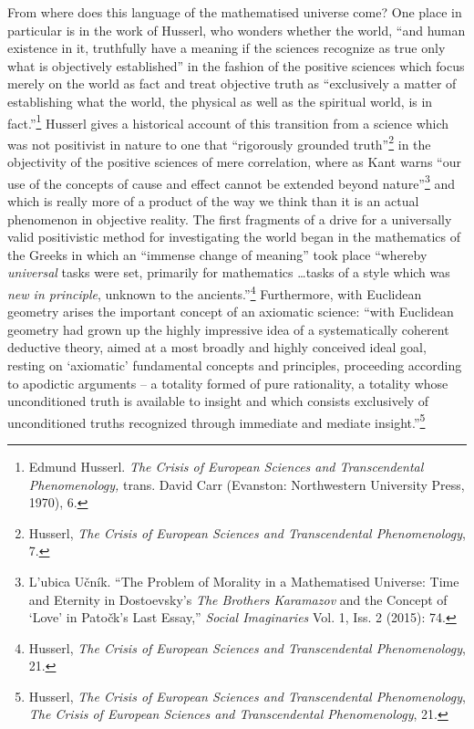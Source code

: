 \documentclass[12pt]{article}
\begin{document}
	From where does this language of the mathematised universe come? One place in particular is in the work of Husserl, who wonders whether the world, ``and human existence in it, truthfully have a meaning if the sciences recognize as true only what is objectively established'' in the fashion of the positive sciences which focus merely on the world as fact and treat objective truth as ``exclusively a matter of establishing what the world, the physical as well as the spiritual world, is in fact.''\footnote{Edmund Husserl. \emph{The Crisis of European Sciences and Transcendental Phenomenology,} trans. David Carr (Evanston: Northwestern University Press, 1970), 6.} Husserl gives a historical account of this transition from a science which was not positivist in nature to one that ``rigorously grounded truth''\footnote{Husserl, \emph{The Crisis of European Sciences and Transcendental Phenomenology}, 7.} in the objectivity of the positive sciences of mere correlation, where as Kant warns ``our use of the concepts of cause and effect cannot be extended beyond nature''\footnote{L'ubica U\v{c}n\'{i}k. ``The Problem of Morality in a Mathematised Universe: Time and Eternity in Dostoevsky's \emph{The Brothers Karamazov} and the Concept of `Love' in Pato\v{c}k's Last Essay,'' \emph{Social Imaginaries} Vol. 1, Iss. 2 (2015): 74.} and which is really more of a product of the way we think than it is an actual phenomenon in objective reality. The first fragments of a drive for a universally valid positivistic method for investigating the world began in the mathematics of the Greeks in which an ``immense change of meaning'' took place ``whereby \emph{universal} tasks were set, primarily for mathematics \ldots tasks of a style which was \emph{new in principle}, unknown to the ancients.''\footnote{Husserl, \emph{The Crisis of European Sciences and Transcendental Phenomenology}, 21.} Furthermore, with Euclidean geometry arises the important concept of an axiomatic science: ``with Euclidean geometry had grown up the highly impressive idea of a systematically coherent deductive theory, aimed at a most broadly and highly conceived ideal goal, resting on `axiomatic' fundamental concepts and principles, proceeding according to apodictic arguments -- a totality formed of pure rationality, a totality whose unconditioned truth is available to insight and which consists exclusively of unconditioned truths recognized through immediate and mediate insight.''\footnote{Husserl, \emph{The Crisis of European Sciences and Transcendental Phenomenology}, \emph{The Crisis of European Sciences and Transcendental Phenomenology}, 21.} 
\end{document}
